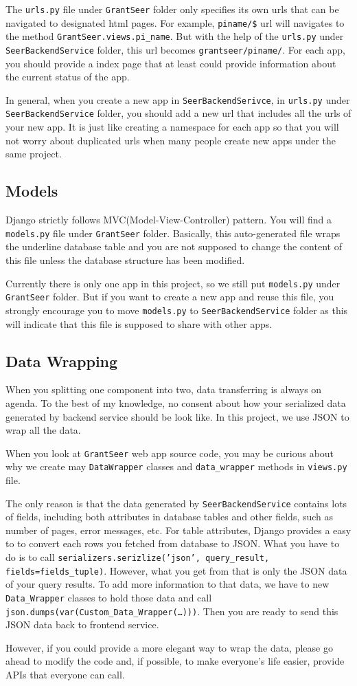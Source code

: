 \documentclass[12pt]{article}
\begin{document}
The \texttt{urls.py} file under \texttt{GrantSeer} folder only specifies its own urls that can be navigated to designated html pages. For example, \texttt{piname/\$} url will navigates to the method \texttt{GrantSeer.views.pi\_name}. But with the help of the \texttt{urls.py} under \texttt{SeerBackendService} folder, this url becomes \texttt{grantseer/piname/}. For each app, you should provide a index page that at least could provide information about the current status of the app.

In general, when you create a new app in \texttt{SeerBackendSerivce}, in \texttt{urls.py} under \texttt{SeerBackendService} folder, you should add a new url that includes all the urls of your new app. It is just like creating a namespace for each app so that you will not worry about duplicated urls when many people create new apps under the same project.

\subsection*{Models}
Django strictly follows MVC(Model-View-Controller) pattern. You will find a \texttt{models.py} file under \texttt{GrantSeer} folder. Basically, this auto-generated file wraps the underline database table and you are not supposed to change the content of this file unless the database structure has been modified.

Currently there is only one app in this project, so we still put \texttt{models.py} under \texttt{GrantSeer} folder. But if you want to create a new app and reuse this file, you strongly encourage you to move \texttt{models.py} to \texttt{SeerBackendService} folder as this will indicate that this file is supposed to share with other apps.

\subsection*{Data Wrapping}
When you splitting one component into two, data transferring is always on agenda. To the best of my knowledge, no consent about how your serialized data generated by backend service should be look like. In this project, we use JSON to wrap all the data.

When you look at \texttt{GrantSeer} web app source code, you may be curious about why we create may \texttt{DataWrapper} classes and \texttt{data\_wrapper} methods in \texttt{views.py} file.

The only reason is that the data generated by \texttt{SeerBackendService} contains lots of fields, including both attributes in database tables and other fields, such as number of pages, error messages, etc. For table attributes, Django provides a easy to to convert each rows you fetched from database to JSON. What you have to do is to call \texttt{serializers.serizlize('json', query\_result, fields=fields\_tuple)}. However, what you get from that is only the JSON data of your query results. To add more information to that data, we have to new \texttt{Data\_Wrapper} classes to hold those data and call \texttt{json.dumps(var(Custom\_Data\_Wrapper(\dots)))}. Then you are ready to send this JSON data back to frontend service.

However, if you could provide a more elegant way to wrap the data, please go ahead to modify the code and, if possible, to make everyone's life easier, provide APIs that everyone can call.
\end{document}
